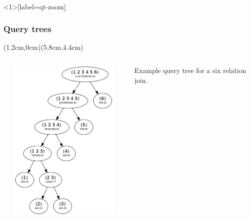 \documentclass{beamer}
\begin{document}
\begin{frame}<1>[label=qt-zoom]
  \frametitle<1>{Query trees}
  (1.2cm,0cm)(5.8cm,4.4cm)

  \begin{columns}
    \begin{column}{7cm}
      \includegraphics[width=7cm,height=8cm]{qt-example.png}
    \end{column}
    \begin{column}{5cm}
      Example query tree for a six relation join.
    \end{column}
  \end{columns}

\end{frame}
\end{document}
